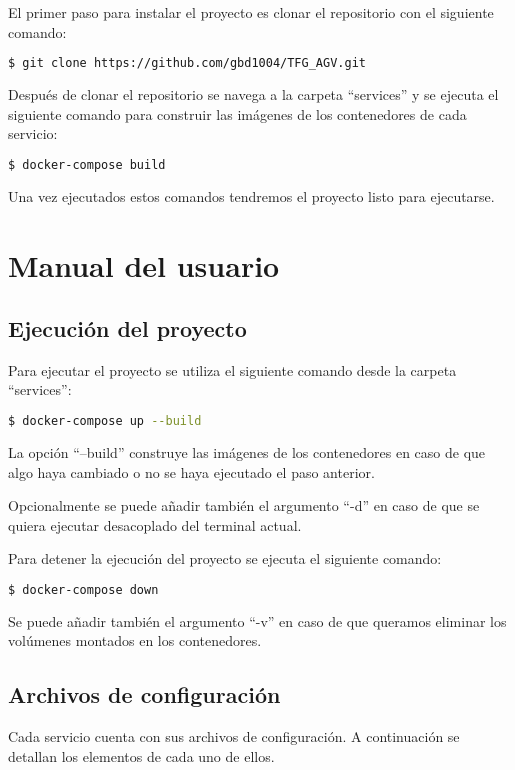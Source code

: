 El primer paso para instalar el proyecto es clonar el repositorio con el siguiente comando:
\begin{lstlisting}[language=bash]
$ git clone https://github.com/gbd1004/TFG_AGV.git
\end{lstlisting}
Después de clonar el repositorio se navega a la carpeta ``services'' y se ejecuta el siguiente 
comando para construir las imágenes de los contenedores de cada servicio:
\begin{lstlisting}[language=bash]
$ docker-compose build
\end{lstlisting}

Una vez ejecutados estos comandos tendremos el proyecto listo para ejecutarse.

\section{Manual del usuario}

\subsection{Ejecución del proyecto}

Para ejecutar el proyecto se utiliza el siguiente comando desde la carpeta ``services'':
\begin{lstlisting}[language=bash]
$ docker-compose up --build
\end{lstlisting}
La opción ``--build'' construye las imágenes de los contenedores en caso de que algo haya cambiado o 
no se haya ejecutado el paso anterior.

Opcionalmente se puede añadir también el argumento ``-d'' en caso de que se quiera ejecutar desacoplado 
del terminal actual.

Para detener la ejecución del proyecto se ejecuta el siguiente comando:
\begin{lstlisting}[language=bash]
$ docker-compose down
\end{lstlisting}
Se puede añadir también el argumento ``-v'' en caso de que queramos eliminar los volúmenes montados 
en los contenedores.

\subsection{Archivos de configuración}

Cada servicio cuenta con sus archivos de configuración. A continuación se detallan los elementos 
de cada uno de ellos.

